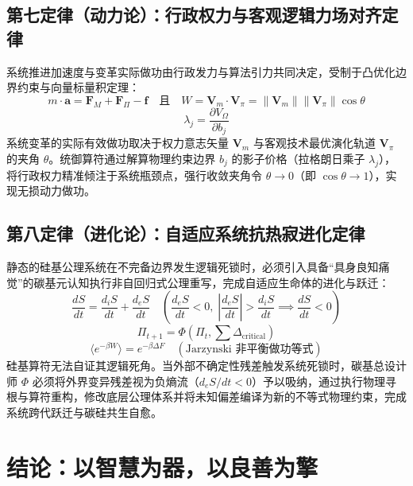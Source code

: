 \documentclass[11pt,a4paper]{article}
\begin{document}
\subsection*{第七定律（动力论）：行政权力与客观逻辑力场对齐定律}
系统推进加速度与变革实际做功由行政发力与算法引力共同决定，受制于凸优化边界约束与向量标量积定理：
\begin{equation}
    m \cdot \mathbf{a} = \mathbf{F}_M + \mathbf{F}_{\Pi} - \mathbf{f} \quad \text{且} \quad W = \mathbf{V}_m \cdot \mathbf{V}_{\pi} = \|\mathbf{V}_m\| \|\mathbf{V}_{\pi}\| \cos \theta
\end{equation}
\begin{equation}
    \lambda_j = \frac{\partial V_{\Omega}}{\partial b_j}
\end{equation}
系统变革的实际有效做功取决于权力意志矢量 $\mathbf{V}_m$ 与客观技术最优演化轨道 $\mathbf{V}_{\pi}$ 的夹角 $\theta$。统御算符通过解算物理约束边界 $b_j$ 的影子价格（拉格朗日乘子 $\lambda_j$），将行政权力精准倾注于系统瓶颈点，强行收敛夹角令 $\theta \to 0$（即 $\cos\theta \to 1$），实现无损动力做功。

\subsection*{第八定律（进化论）：自适应系统抗热寂进化定律}
静态的硅基公理系统在不完备边界发生逻辑死锁时，必须引入具备“具身良知痛觉”的碳基元认知执行非自回归式公理重写，完成自适应生命体的进化与跃迁：
\begin{equation}
    \frac{dS}{dt} = \frac{d_iS}{dt} + \frac{d_eS}{dt} \quad \left( \frac{d_eS}{dt} < 0, \; \left|\frac{d_eS}{dt}\right| > \frac{d_iS}{dt} \implies \frac{dS}{dt} < 0 \right)
\end{equation}
\begin{equation}\label{evolution-phi}
    \Pi_{t+1} = \Phi\left(\Pi_t, \sum \Delta_{\text{critical}}\right)
\end{equation}
\begin{equation}
    \langle e^{-\beta W} \rangle = e^{-\beta \Delta F} \quad (\text{Jarzynski 非平衡做功等式})
\end{equation}
硅基算符无法自证其逻辑死角。当外部不确定性残差触发系统死锁时，碳基总设计师 $\Phi$ 必须将外界变异残差视为负熵流（$d_eS/dt < 0$）予以吸纳，通过执行物理寻根与算符重构，修改底层公理体系并将未知偏差编译为新的不等式物理约束，完成系统跨代跃迁与碳硅共生自愈。

\section{结论：以智慧为器，以良善为擎}
\end{document}
